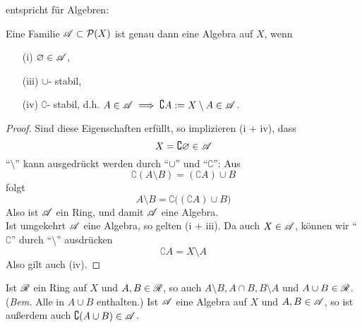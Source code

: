 entspricht für Algebren:
\begin{lemma}
\begin{mdframed}
Eine Familie $\AA \subset \mathcal{P}(X)$ ist genau dann eine Algebra auf $X$, wenn
\begin{enumerate}[topsep=3pt, itemsep=0pt]
\item[(i)] $\emptyset \in \AA$,
\item[(iii)] $\cup$- stabil,
\item[(iv)] $\complement$- stabil, d.h. $A \in \AA \implies \complement A := X\setminus A \in \AA$.
\end{enumerate}
\end{mdframed}
\begin{proof}
Sind diese Eigenschaften erfüllt, so implizieren (i + iv), dass
\begin{equation*}
X = \complement \emptyset \in \AA
\end{equation*}
``$\setminus$'' kann ausgedrückt werden durch ``$\cup$'' und ``$\complement$'': Aus
\begin{equation*}
\complement (A \setminus B) = (\complement A) \cup B
\end{equation*}
folgt
\begin{equation*}
A \setminus B = \complement \big( (\complement A) \cup B \big)
\end{equation*}
Also ist $\AA$ ein Ring, und damit $\AA$ eine Algebra. \\
Ist umgekehrt $\AA$ eine Algebra, so gelten (i + iii). Da auch $X \in \AA$, können wir ``$\complement$'' durch ``$\setminus$'' ausdrücken
\begin{equation*}
\complement A = X \setminus A
\end{equation*}
Also gilt auch (iv).
\end{proof}
\end{lemma}

\begin{folgerung}
Ist $\RR$ ein Ring auf $X$ und $A,B \in \RR$, so auch $A\setminus B, A\cap B, B\setminus A$ und $A\cup B \in \RR$. (\textit{Bem.} Alle in $A\cup B$ enthalten.) Ist $\AA$ eine Algebra auf $X$ und $A,B \in \AA$, so ist außerdem auch $\complement (A \cup B) \in \AA$.
\end{folgerung}


